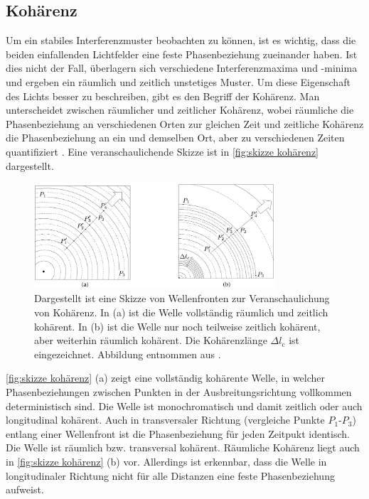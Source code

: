 \subsection{Kohärenz}
\label{ssec:Kohärenz}
Um ein stabiles Interferenzmuster beobachten zu können, ist es wichtig, dass die beiden einfallenden Lichtfelder eine feste Phasenbeziehung zueinander haben. 
Ist dies nicht der Fall, überlagern sich verschiedene Interferenzmaxima und -minima und ergeben ein räumlich und zeitlich unstetiges Muster. 
Um diese Eigenschaft des Lichts besser zu beschreiben, gibt es den Begriff der Kohärenz.
Man unterscheidet zwischen räumlicher und zeitlicher Kohärenz, wobei räumliche die Phasenbeziehung an verschiedenen Orten zur gleichen Zeit und zeitliche Kohärenz die Phasenbeziehung an ein und demselben Ort, aber zu verschiedenen Zeiten quantifiziert \cite[Kap. 9.2]{hechtOptik2018}.
Eine veranschaulichende Skizze ist in \autoref{fig:skizze kohärenz} dargestellt.
\begin{figure}[h]
    \centering
    \includegraphics[width=0.8\textwidth]{images/Theorie/Hecht_9.6.png}
    \caption{Dargestellt ist eine Skizze von Wellenfronten zur Veranschaulichung von Kohärenz. In (a) ist die Welle vollständig räumlich und zeitlich kohärent. In (b) ist die Welle nur noch teilweise zeitlich kohärent, aber weiterhin räumlich kohärent. Die Kohärenzlänge $\Delta l_\mathrm{c}$ ist eingezeichnet. Abbildung entnommen aus \cite{hechtOptik2018}.}
    \label{fig:skizze kohärenz}
\end{figure}
\autoref{fig:skizze kohärenz} (a) zeigt eine vollständig kohärente Welle, in welcher Phasenbeziehungen zwischen Punkten in der Ausbreitungsrichtung vollkommen deterministisch sind. 
Die Welle ist monochromatisch und damit zeitlich oder auch longitudinal kohärent. 
Auch in transversaler Richtung (vergleiche Punkte $P_1$-$P_3$) entlang einer Wellenfront ist die Phasenbeziehung für jeden Zeitpukt identisch. 
Die Welle ist räumlich bzw. transversal kohärent. 
Räumliche Kohärenz liegt auch in \autoref{fig:skizze kohärenz} (b) vor. 
Allerdings ist erkennbar, dass die Welle in longitudinaler Richtung nicht für alle Distanzen eine feste Phasenbeziehung aufweist. 
